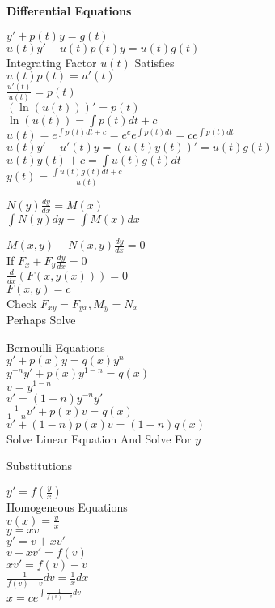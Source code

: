 \Large
\twocolumn

\textbf{Differential Equations}

$y'+p(t)y=g(t)$ \\
$u(t)y'+u(t)p(t)y=u(t)g(t)$ \\
Integrating Factor $u(t)$ Satisfies \\
$u(t)p(t)=u'(t)$ \\
$\frac{u'(t)}{u(t)}=p(t)$ \\
$(\ln(u(t)))'=p(t)$ \\
$\ln(u(t))=\int p(t) dt + c$ \\
$u(t)=e^{\int p(t) dt + c}=e^{c}e^{\int p(t) dt}=ce^{\int p(t) dt}$ \\
$u(t)y'+u'(t)y=(u(t)y(t))'=u(t)g(t)$ \\
$u(t)y(t)+c=\int u(t)g(t) dt$ \\
$y(t)=\frac{\int u(t)g(t) dt + c}{u(t)}$

$N(y)\frac{dy}{dx}=M(x)$ \\
$\int N(y)dy=\int M(x) dx$

$M(x,y)+N(x,y)\frac{dy}{dx}=0$ \\
If $F_x+F_y \frac{dy}{dx}=0$ \\
$\frac{d}{dx}(F(x,y(x)))=0$ \\
$F(x,y)=c$ \\
Check $F_{xy}=F_{yx},M_y=N_x$ \\
Perhaps Solve

Bernoulli Equations \\
$y'+p(x)y=q(x)y^n$ \\
$y^{-n}y'+p(x)y^{1-n}=q(x)$ \\
$v=y^{1-n}$ \\
$v'=(1-n)y^{-n}y'$ \\
$\frac{1}{1-n}v'+p(x)v=q(x)$ \\
$v'+(1-n)p(x)v=(1-n)q(x)$ \\
Solve Linear Equation And Solve For $y$

Substitutions

$y'=f\left(\frac{y}{x} \right)$ \\
Homogeneous Equations \\
$v(x)=\frac{y}{x}$ \\
$y=xv$ \\
$y'=v+xv'$ \\
$v+xv'=f(v)$ \\
$xv'=f(v)-v$ \\
$\frac{1}{f(v)-v} dv=\frac{1}{x}dx$ \\
$x=ce^{\int \frac{1}{f(v)-v} dv}$

